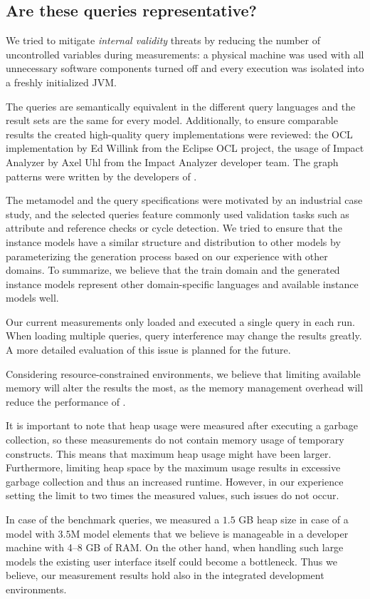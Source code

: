 \subsection{Are these queries representative?}


We tried to mitigate \emph{internal validity} threats by reducing the number of
uncontrolled variables during measurements: a physical machine was used with all
unnecessary software components turned off and every execution was isolated into
a freshly initialized JVM.

The queries are semantically equivalent in the different query languages and the
result sets are the same for every model. Additionally, to ensure comparable
results the created high-quality query implementations were reviewed: the OCL
implementation by Ed Willink from the Eclipse OCL project, the usage of Impact
Analyzer by Axel Uhl from the Impact Analyzer developer team. The graph patterns
were written by the developers of \incquery{}.

The metamodel and the query specifications were motivated by an industrial case
study, and the selected queries feature commonly used validation tasks such as
attribute and reference checks or cycle detection. We tried to ensure that the
instance models have a similar structure and distribution to other models by
parameterizing the generation process based on our experience with other
domains. To summarize, we believe that the train domain and the generated
instance models represent other domain-specific languages and available instance
models well.

Our current measurements only loaded and executed a single query in each run.
When loading multiple queries, query interference may change the results
greatly. A more detailed evaluation of this issue is planned for the future.

Considering resource-constrained environments, we believe that limiting
available memory will alter the results the most, as the memory management
overhead will reduce the performance of \incquery{}.

It is important to note that heap usage were measured after executing a garbage
collection, so these measurements do not contain memory usage of temporary
constructs. This means that maximum heap usage might have been larger. Furthermore,
limiting heap space by the maximum usage results in excessive garbage collection
and thus an increased runtime. However, in our experience setting the limit to
two times the measured values, such issues do not occur.

In case of the benchmark queries, we measured a $1.5$ GB heap size in case of a
model with $3.5$M model elements that we believe is manageable in a developer
machine with 4--8 GB of RAM. On the other hand, when handling such large
models the existing user interface itself could become a bottleneck. Thus we
believe, our measurement results hold also in the integrated development
environments.
